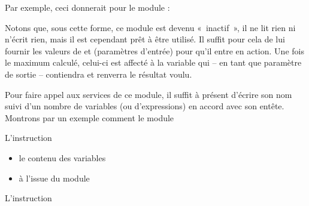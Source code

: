 	Par exemple, ceci donnerait pour le module  :


	Notons que, sous cette forme, ce module est devenu «~inactif~», il ne
	lit rien ni n’écrit rien, mais il est cependant prêt à être utilisé. Il
	suffit pour cela de lui fournir les valeurs de  et
	 (paramètres d’entrée) pour qu’il entre en action.
	Une fois le maximum calculé, celui-ci est affecté à la variable
	 qui – en tant que paramètre de sortie –
	contiendra et renverra le résultat voulu.

	{Pour faire appel aux services de ce module, il
	suffit à présent d’écrire son nom suivi d’un nombre de variables (ou
	d'expressions) en accord avec son entête. Montrons par
	un exemple comment le module
	}


	{
	{L’instruction
	}}
	
	\begin{itemize}
	\item {
	{le contenu des variables
	}}
	\item {
	{à l’issue du module
	}}
	\end{itemize}

	{
	{L’instruction
	}}
	
